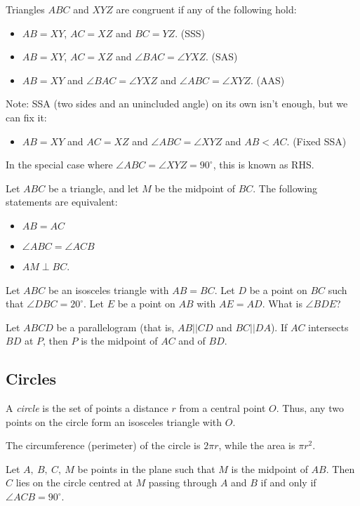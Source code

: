 Triangles $ABC$ and $XYZ$ are congruent if any of the following hold:
\begin{itemize}
  \item $AB=XY$, $AC=XZ$ and $BC=YZ$. (SSS)
  \item $AB=XY$, $AC=XZ$ and $\angle BAC=\angle YXZ$. (SAS)
  \item $AB=XY$ and $\angle BAC=\angle YXZ$ and $\angle ABC=\angle XYZ$. (AAS)
\end{itemize}
Note: SSA (two sides and an unincluded angle) on its own isn't enough, but we
can fix it:
\begin{itemize}
  \item $AB=XY$ and $AC=XZ$ and $\angle ABC=\angle XYZ$ and $AB<AC$. (Fixed SSA)
\end{itemize}
In the special case where $\angle ABC=\angle XYZ=90^\circ$, this is known as RHS.\@
\begin{result}{\label{r:b:g:c:1}}
  Let $ABC$ be a triangle, and let $M$ be the midpoint of $BC$.
  The following statements are equivalent:
  \begin{itemize}
    \item $AB=AC$
    \item $\angle ABC=\angle ACB$
    \item $AM\perp BC$.
  \end{itemize}
\end{result}
\begin{problem}
  Let $ABC$ be an isosceles triangle with $AB=BC$. Let $D$ be a point on $BC$
  such that $\angle DBC=20^\circ$. Let $E$ be a point on $AB$ with $AE=AD$. What
  is $\angle BDE$?
\end{problem}
\begin{result}{\label{r:b:g:c:2}}
  Let $ABCD$ be a parallelogram (that is, $AB||CD$ and $BC||DA$). If $AC$
  intersects $BD$ at $P$, then $P$ is the midpoint of $AC$ and of $BD$.
\end{result}
\subsection{Circles}
A \emph{circle} is the set of points a distance $r$ from a central point $O$.
Thus, any two points on the circle form an isosceles triangle with $O$.

The circumference (perimeter) of the circle is $2\pi r$, while the area is $\pi
r^2$.
\begin{result}{\label{r:b:g:ci:1}}
  Let $A,\ B,\ C,\ M$ be points in the plane such that $M$ is the midpoint of
  $AB$. Then $C$ lies on the circle centred at $M$ passing through $A$ and $B$
  if and only if $\angle ACB=90^\circ$.
\end{result}

